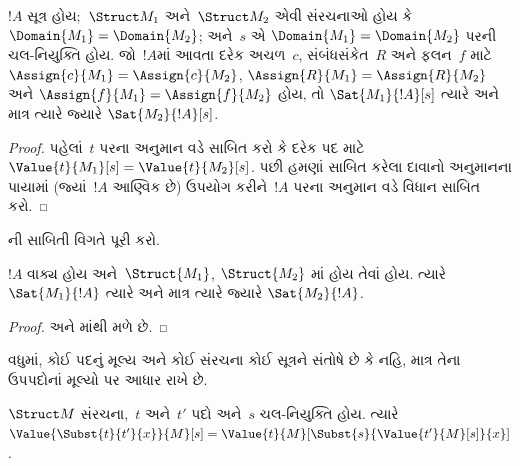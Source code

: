 \begin{prop}[પ્રસ્તુત ઘટકો દ્વારા નિર્ધારણ]
  $!A$ સૂત્ર હોય;~$\Struct M_1$ અને~$\Struct M_2$ એવી
  સંરચનાઓ હોય કે $\Domain{M_1}=\Domain{M_2}$; અને~$s$ એ
  $\Domain{M_1}=\Domain{M_2}$ પરની ચલ-નિયુક્તિ હોય. જો~$!A$માં આવતા
  દરેક અચળ~$c$, સંબંધસંકેત~$R$ અને ફલન~$f$ માટે
  $\Assign{c}{M_1}=\Assign{c}{M_2}$,
  $\Assign{R}{M_1}=\Assign{R}{M_2}$ અને
  $\Assign{f}{M_1}=\Assign{f}{M_2}$ હોય, તો
  $\Sat{M_1}{!A}[s]$ ત્યારે અને માત્ર ત્યારે જ્યારે
  $\Sat{M_2}{!A}[s]$.
\end{prop}

\begin{proof}
  પહેલાં~$t$ પરના અનુમાન વડે સાબિત કરો કે દરેક પદ માટે
  $\Value{t}{M_1}[s]=\Value{t}{M_2}[s]$. પછી હમણાં સાબિત કરેલા દાવાનો
  અનુમાનના પાયામાં (જ્યાં~$!A$ આણ્વિક છે) ઉપયોગ કરીને~$!A$ પરના
  અનુમાન વડે વિધાન સાબિત કરો.
\end{proof}

\begin{prob}
ની સાબિતી વિગતે પૂરી કરો.
\end{prob}

\begin{cor}[વાક્યો માટે પ્રસ્તુત ઘટકો દ્વારા નિર્ધારણ]
  $!A$ વાક્ય હોય અને~$\Struct{M_1}$, $\Struct{M_2}$
  માં હોય તેવાં હોય. ત્યારે
  $\Sat{M_1}{!A}$ ત્યારે અને માત્ર ત્યારે જ્યારે $\Sat{M_2}{!A}$.
\end{cor}

\begin{proof}
 અને માંથી મળે છે.
\end{proof}

વધુમાં, કોઈ પદનું મૂલ્ય અને કોઈ સંરચના કોઈ સૂત્રને
સંતોષે છે કે નહિ, માત્ર તેના ઉપપદોનાં મૂલ્યો પર આધાર રાખે છે.

\begin{prop}
$\Struct M$ સંરચના,~$t$ અને~$t'$ પદો અને~$s$ ચલ-નિયુક્તિ હોય.
ત્યારે $\Value{\Subst{t}{t'}{x}}{M}[s] =
\Value{t}{M}[\Subst{s}{\Value{t'}{M}[s]}{x}]$.
\end{prop}

